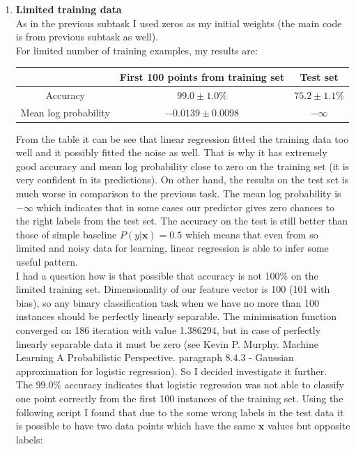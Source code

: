 \documentclass{article}
\newcommand{\vect}[1]{\boldsymbol{#1}} %
\begin{document}
\begin{enumerate}[label=(\alph*)]
					\item
						\textbf{Limited training data}\\
						As in the previous subtask I used zeros as my initial weights (the main code is from previous subtask as well).\\
						For limited number of training examples, my results are:
						\begin{center}
							\begin{tabular}{| c | c | c |}
								\hline
								\, & First 100 points from training set & Test set \\ 
								\hline
								Accuracy                  & $99.0 \pm 1.0 \%$ & $ 75.2 \pm 1.1 \%$ \\ 
								\hline
								Mean log probability &$-0.0139 \pm 0.0098$ & $-\infty$ \\
								\hline
							\end{tabular}
						\end{center}
						From the table it can be see that linear regression fitted the training data too well and it possibly fitted the noise as well.  That is why it has extremely good accuracy and mean log probability close to zero on the training set (it is very confident in its predictions). On other hand, the results on the test set is much worse in comparison to the previous task.  The mean log probability is $-\infty$ which indicates that in some cases our predictor gives zero chances to the right labels from the test set. The accuracy on the test is still better than those of simple baseline $P(y | \vect{x})=0.5$ which means that even from so limited and noisy data for learning, linear regression is able to infer some useful pattern.
						\\
						I had a question how is that possible that accuracy is not 100\% on the limited training set. Dimensionality of our feature vector is 100 (101 with bias), so any binary classification task when we have no more than 100 instances should be perfectly linearly separable. The minimisation function converged on 186 iteration with value 1.386294, but in case of perfectly linearly separable data it must be zero (see  Kevin P. Murphy. Machine Learning  A Probabilistic Perspective. paragraph 8.4.3 - Gaussian approximation for logistic regression). So I decided investigate it further. 
						\\
						The $99.0\%$ accuracy indicates that logistic regression was not able to classify one point correctly from the first 100 instances of the training set. 
						Using the following script I found that due to the some wrong labels in the test data it is possible to have two data points which have the same $\vect{x}$ values but opposite labels:

\end{enumerate}
\end{document}

